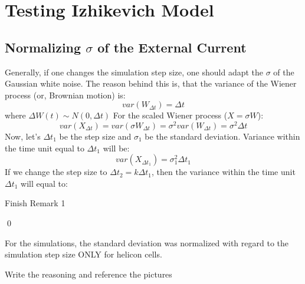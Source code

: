 \documentclass[../../extended_report.tex]{subfiles}
\begin{document}
\section{Testing Izhikevich Model}

\subsection{Normalizing $\sigma$ of the External Current}\label{remark_wiener_process}

Generally, if one changes the simulation step size, one should adapt the $\sigma$ of the Gaussian white noise. The reason behind this is, that the variance of the Wiener process (or, Brownian motion) is:
\begin{equation*}
    var(W_{\Delta t})=\Delta t
\end{equation*}
where $\Delta W(t) \sim N(0, \Delta t)$
For the scaled Wiener process ($X = \sigma W$):
\begin{equation*}
    var(X_{\Delta t}) = var(\sigma W_{\Delta t}) = \sigma^2 var(W_{\Delta t}) = \sigma^2 \Delta t
\end{equation*}
Now, let's $\Delta t_1$ be the step size and $\sigma_1$ be the standard deviation. Variance within the time unit equal to $\Delta t_1$ will be:
\begin{equation*}
    var(X_{\Delta t_1}) = \sigma_1^2 \Delta t_1
\end{equation*}
If we change the step size to $\Delta t_2 = k \Delta t_1$, then the variance within the time unit $\Delta t_1$ will equal to:
\begin{todo}
    Finish Remark 1
\end{todo}
\qed

\begin{remark}\label{remark-normalizing_std_external_current}
    For the simulations, the standard deviation was normalized with regard to the simulation step size ONLY for helicon cells.
    \begin{todo}
        Write the reasoning and reference the pictures
    \end{todo}
\end{remark}
\end{document}
